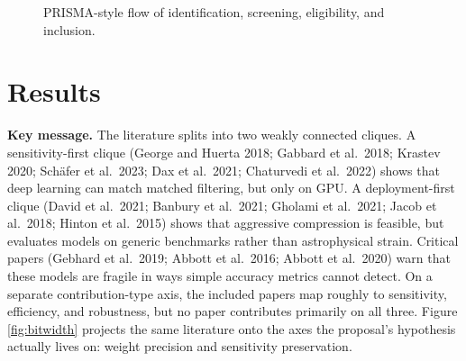 \documentclass[11pt,a4paper]{article}
\begin{document}
\begin{figure}[htbp]
\centering
{}
\caption{PRISMA-style flow of identification, screening, eligibility, and inclusion.}
\label{fig:prisma}
\end{figure}

\section{Results}

\noindent\textbf{Key message.} The literature splits into two weakly connected cliques. A sensitivity-first clique (George and Huerta 2018; Gabbard et al.\ 2018; Krastev 2020; Schäfer et al.\ 2023; Dax et al.\ 2021; Chaturvedi et al.\ 2022) shows that deep learning can match matched filtering, but only on GPU. A deployment-first clique (David et al.\ 2021; Banbury et al.\ 2021; Gholami et al.\ 2021; Jacob et al.\ 2018; Hinton et al.\ 2015) shows that aggressive compression is feasible, but evaluates models on generic benchmarks rather than astrophysical strain. Critical papers (Gebhard et al.\ 2019; Abbott et al.\ 2016; Abbott et al.\ 2020) warn that these models are fragile in ways simple accuracy metrics cannot detect. On a separate contribution-type axis, the included papers map roughly to sensitivity, efficiency, and robustness, but no paper contributes primarily on all three. Figure \ref{fig:bitwidth} projects the same literature onto the axes the proposal's hypothesis actually lives on: weight precision and sensitivity preservation.
\end{document}

